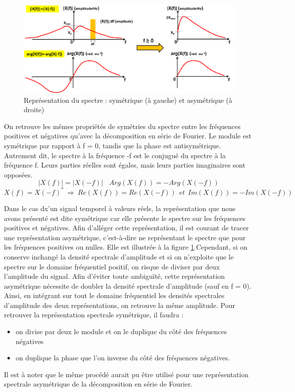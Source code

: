 	\begin{figure}[h!]
		\centering
		\includegraphics[scale=0.5]{images/Representation_spectre_Fourier.png}
		\caption{Représentation du spectre : symétrique (à gauche) et asymétrique (à droite)}	
		\label{Fig:Representation_spectre_Fourier} 
	\end{figure}
	
	
	On retrouve les mêmes propriétés de symétries du spectre entre les fréquences positives et négatives qu'avec la décomposition en série de Fourier. Le module est symétrique par rapport à f = 0, tandis que la phase est antisymétrique. Autrement dit, le spectre à la fréquence -f est le conjugué du spectre à la fréquence f. Leurs parties réelles sont égales, mais leurs parties imaginaires sont opposées.
	\begin{equation}\label{Symétrie_TF_module_phase}
	|X(f)|=|X(-f)|~~~~Arg(X(f))=-Arg(X(-f))
	\end{equation}
	\begin{equation}\label{Symétrie_TF_module_RI}
	X(f)=X(-f)^{*}~\Rightarrow~Re(X(f))=Re(X(-f))~~et~~Im(X(f))=-Im(X(-f))
	\end{equation}

	
	Dans le cas dx'un signal temporel à valeurs réels, la représentation que nous avons présenté est dite symétrique car elle présente le spectre sur les fréquences positives et négatives. Afin d'alléger cette représentation, il est courant de tracer une représentation asymétrique, c'est-à-dire ne représentant le spectre que pour les fréquences positives ou nulles. Elle est illustrée à la figure \ref{Fig:Representation_spectre_Fourier}.Cependant, si on conserve inchangé la densité spectrale d'amplitude et si on n'exploite que le spectre sur le domaine fréquentiel positif, on risque de diviser par deux l'amplitude du signal. Afin d'éviter toute ambiguïté, cette représentation asymétrique nécessite de doubler la densité spectrale d'amplitude (sauf en f = 0). Ainsi, en intégrant sur tout le domaine fréquentiel les densités spectrales d'amplitude des deux représentations, on retrouve la même amplitude. Pour retrouver la représentation spectrale symétrique, il faudra :
	\begin{itemize}
		\item on divise par deux le module et on le duplique du côté des fréquences négatives
		\item on duplique la phase que l'on inverse du côté des fréquences négatives.
	\end{itemize}
	Il est à noter que le même procédé aurait pu être utilisé pour une représentation spectrale asymétrique de la décomposition en série de Fourier.\\
	
